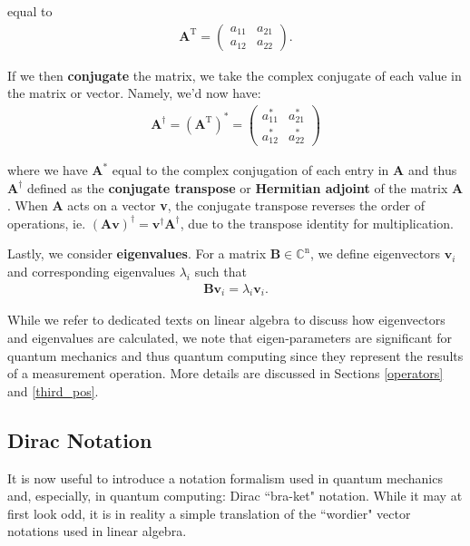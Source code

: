 \documentclass[11pt]{article} %
\begin{document}
\noindent equal to
\begin{align}
    \textbf{A}^\textrm{T} =
    \begin{pmatrix}
        a_{11} & a_{21} \\
        a_{12} & a_{22}
    \end{pmatrix}. \nonumber
\end{align}

If we then \textbf{conjugate} the matrix, we take the complex conjugate of each value in the matrix or vector. Namely, we'd now have:
\begin{align}
    \textbf{A}^\dagger = \left(\textbf{A}^\textrm{T}\right)^\ast =
    \begin{pmatrix}
        a_{11}^\ast & a_{21}^\ast \\
        a_{12}^\ast & a_{22}^\ast
    \end{pmatrix} \nonumber
\end{align}

\noindent where we have $\textbf{A}^\ast$ equal to the complex conjugation of each entry in $\textbf{A}$ and thus $\textbf{A}^\dagger$ defined as the \textbf{conjugate transpose} or \textbf{Hermitian adjoint} of the matrix $\textbf{A}$. When \textbf{A} acts on a vector \textbf{v}, the conjugate transpose reverses the order of operations, ie. $(\textbf{Av})^\dagger = \textbf{v}^\dagger\textbf{A}^\dagger$, due to the transpose identity for multiplication.

Lastly, we consider \textbf{eigenvalues}. For a matrix $\textbf{B} \in \mathbb{C}^\textrm{n}$, we define eigenvectors $\textbf{v}_i$ and corresponding eigenvalues $\lambda_i$ such that
\begin{align}
    \textbf{B}\textbf{v}_i = \lambda_i\textbf{v}_i. \nonumber
\end{align}

\noindent While we refer to dedicated texts on linear algebra to discuss how eigenvectors and eigenvalues are calculated, we note that eigen-parameters are significant for quantum mechanics and thus quantum computing since they represent the results of a measurement operation. More details are discussed in Sections \ref{operators} and \ref{third_pos}.

\subsection{Dirac Notation}
It is now useful to introduce a notation formalism used in quantum mechanics and, especially, in quantum computing: Dirac ``bra-ket" notation. While it may at first look odd, it is in reality a simple translation of the ``wordier" vector notations used in linear algebra.
\end{document}

